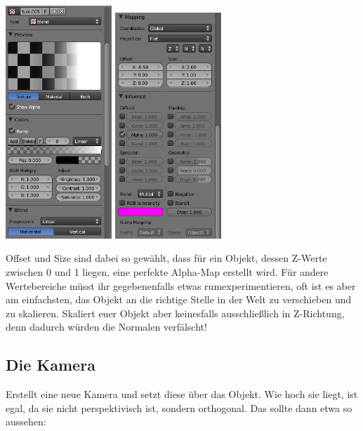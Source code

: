 \documentclass[a4paper]{article}
\begin{document}
\begin{center}
\includegraphics[width=40mm]{../images/blender/bumpmap-texture-3.png}
\includegraphics[width=40mm]{../images/blender/bumpmap-texture-4.png}
\end{center}

Offset und Size sind dabei so gewählt, dass für ein Objekt, dessen Z-Werte zwischen 0 und 1 liegen, eine perfekte Alpha-Map erstellt wird. Für andere
Wertebereiche müsst ihr gegebenenfalls etwas rumexperimentieren, oft ist es aber am einfachsten, das Objekt an die richtige Stelle in der Welt zu
verschieben und zu skalieren. Skaliert euer Objekt aber keinesfalls ausschließlich in Z-Richtung, denn dadurch würden die Normalen verfälscht!

\subsection{Die Kamera}
Erstellt eine neue Kamera und setzt diese über das Objekt. Wie hoch sie liegt, ist egal, da sie nicht perspektivisch ist, sondern orthogonal. Das sollte
dann etwa so aussehen:
\end{document}
